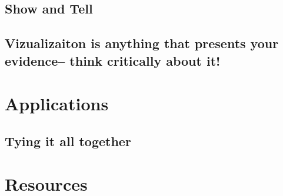 \documentclass[]{book}
\begin{document}
\section{Show and Tell}\label{show-and-tell}

\section{Vizualizaiton is anything that presents your evidence-- think
critically about
it!}\label{vizualizaiton-is-anything-that-presents-your-evidence-think-critically-about-it}

\chapter{Applications}\label{applications}

\section{Tying it all together}\label{tying-it-all-together}

\chapter{Resources}\label{resources}


\end{document}
